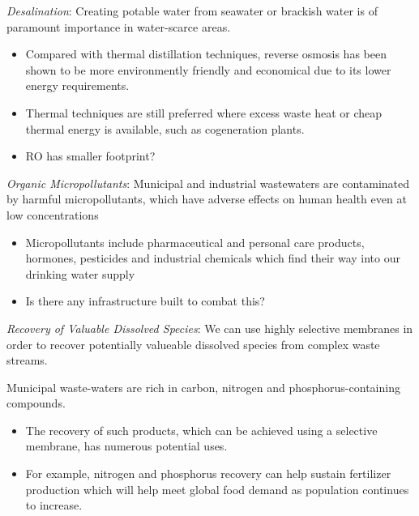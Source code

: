  \textit{Desalination}:
  Creating potable water from seawater or brackish water is of paramount importance
  in water-scarce areas. 
  \begin{itemize}
  	\item Compared with thermal distillation techniques, reverse osmosis has been 
  	shown to be more environmently friendly and economical due to its lower energy
  	requirements.
  	\item Thermal techniques are still preferred where excess waste heat or cheap 
  	thermal energy is available, such as cogeneration plants.
  	\item RO has smaller footprint?
  \end{itemize}

  \textit{Organic Micropollutants}:
  Municipal and industrial wastewaters are contaminated by harmful
  micropollutants, which have adverse effects on human health even at low 
  concentrations\cite{schwarzenbach_challenge_2006}
  \begin{itemize}
    \item Micropollutants include pharmaceutical and personal care products, 
    hormones, pesticides and industrial chemicals which find their way into
    our drinking water supply
    \item Is there any infrastructure built to combat this?
  \end{itemize}
  
  \textit{Recovery of Valuable Dissolved Species}: We can use highly selective
  membranes in order to recover potentially valueable dissolved species from 
  complex waste streams. 
  
  Municipal waste-waters are rich in carbon, nitrogen and phosphorus-containing 
  compounds. 
  \begin{itemize}  
    \item The recovery of such products, which can be achieved using a 
    selective membrane, has numerous potential uses.\cite{sales_resource_2015}
    \item For example, nitrogen and phosphorus recovery can help sustain fertilizer 
    production which will help meet global food demand as population continues
    to increase.\cite{xie_membrane-based_2016}
  \end{itemize}

